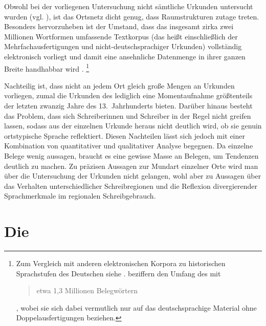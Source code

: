 Obwohl bei der vorliegenen Untersuchung nicht sämtliche Urkunden
untersucht wurden (vgl. ), ist das Ortsnetz dicht genug,
dass Raumstrukturen zutage treten. Besonders hervorzuheben
ist der Umstand, dass das insgesamt zirka zwei Millionen Wortformen umfassende
Textkorpus (das heißt einschließlich der Mehrfachausfertigungen und
nicht-deutschsprachiger Urkunden) vollständig elektronisch vorliegt
\autocites{gniffkerapp2005}{cao-online} und damit eine ansehnliche Datenmenge
in ihrer ganzen Breite handhabbar wird
\autocite{beckerschallert2021,beckerschallert2022b}.%
%
	\footnote{Zum Vergleich mit anderen elektronischen Korpora zu
	historischen Sprachstufen des Deutschen siehe
	\citet{dipper2015}. \citet[391]{gniffkerapp2005} beziffern den Umfang des
	\CAO{} mit \blockquote{etwa 1,3 Millionen Belegwörtern}, wobei sie sich
	dabei vermutlich nur auf das deutschsprachige Material ohne
	Doppelausfertigungen beziehen.} %

Nachteilig ist, dass nicht an jedem Ort gleich große Mengen an
Urkunden vorliegen, zumal die Urkunden des \CAO{} lediglich eine
Momentaufnahme größtenteils der letzten zwanzig Jahre des 13.~Jahrhunderts
bieten. Darüber hinaus besteht das Problem, dass sich Schreiberinnen und
Schreiber in der Regel nicht greifen lassen, sodass
aus der einzelnen Urkunde heraus nicht deutlich wird, ob sie genuin
ortstypische Sprache reflektiert. Diesen Nachteilen lässt sich jedoch mit einer
Kombination von quantitativer und qualitativer Analyse begegnen. Da einzelne
Belege wenig aussagen, braucht es eine gewisse Masse an Belegen, um Tendenzen
deutlich zu machen. Zu präzisen Aus\-sagen zur Mundart
einzelner Orte wird man über die Untersuchung der Urkunden nicht gelangen, wohl
aber zu Aussagen über das Verhalten unterschiedlicher Schreibregionen und die
Reflexion divergierender Sprachmerkmale im regionalen Schreibgebrauch.


\section{Die }
\label{sec:materialkc}

